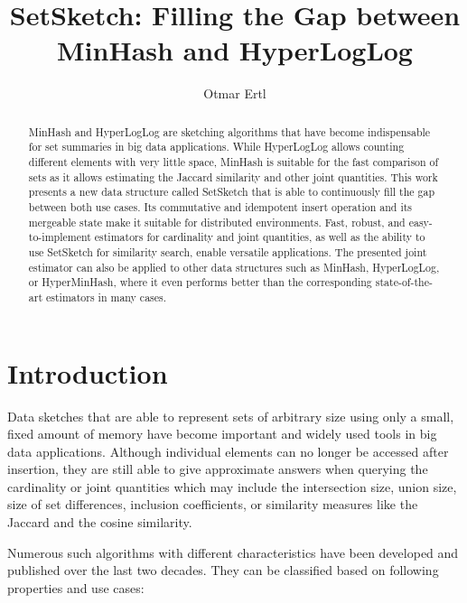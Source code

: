 \documentclass[sigconf, nonacm]{acmart}
\begin{document}
\title{SetSketch: Filling the Gap between MinHash and HyperLogLog} 

\author{Otmar Ertl}

\begin{abstract}
MinHash and HyperLogLog are sketching algorithms that have become indispensable for set summaries in big data applications. While HyperLogLog allows counting different elements with very little space, MinHash is suitable for the fast comparison of sets as it allows estimating the Jaccard similarity and other joint quantities. This work presents a new data structure called SetSketch that is able to continuously fill the gap between both use cases. Its commutative and idempotent insert operation and its mergeable state make it suitable for distributed environments. Fast, robust, and easy-to-implement estimators for cardinality and joint quantities, as well as the ability to use SetSketch for similarity search, enable versatile applications. The presented joint estimator can also be applied to other data structures such as MinHash, HyperLogLog, or HyperMinHash, where it even performs better than the corresponding state-of-the-art estimators in many cases.
\end{abstract}

\maketitle


\pagestyle{plain}


\section{Introduction}
\label{sec:intro}
Data sketches \cite{Cormode2017} that are able to represent sets of arbitrary size using only a small, fixed amount of memory have become important and widely used tools in big data applications. Although individual elements can no longer be accessed after insertion, they are still able to give approximate answers when querying the cardinality or joint quantities which may include the intersection size, union size, size of set differences, inclusion coefficients, or similarity measures like the Jaccard and the cosine similarity.

Numerous such algorithms with different characteristics have been developed and published over the last two decades. 
They can be classified based on following properties \cite{Pettie2020} and use cases:
\end{document}
